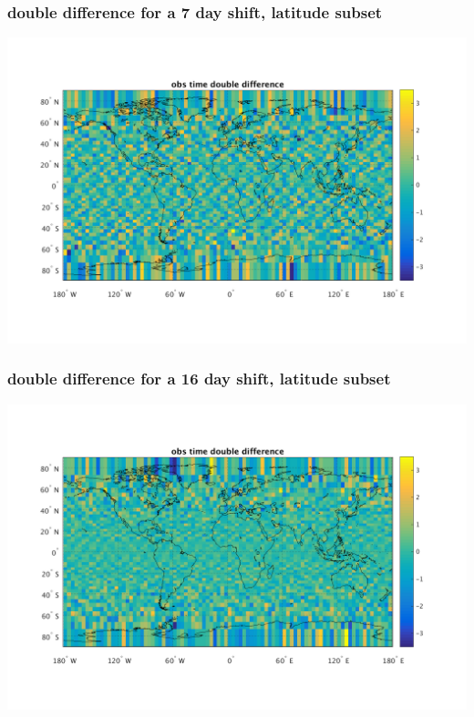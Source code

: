\documentclass[11pt]{beamer}
\begin{document}
\begin{frame}
\frametitle{double difference for a 7 day shift, latitude subset}
\begin{center}
  \includegraphics[scale=0.5]{slackfigs/ddiff_7_day_shift_latsub.png}
\end{center}
\end{frame} %
\begin{frame}
\frametitle{double difference for a 16 day shift, latitude subset}
\begin{center}
  \includegraphics[scale=0.5]{slackfigs/ddiff_16_day_shift_latsub.png}
\end{center}
\end{frame} %
\end{document}
